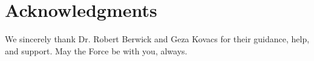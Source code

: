 \documentclass[preprint]{style}
\begin{document}
\section{Acknowledgments}

We sincerely thank Dr. Robert Berwick  and Geza Kovacs
for their guidance, help, and support. May the Force be with you,
always.



%


\balancecolumns
\end{document}
